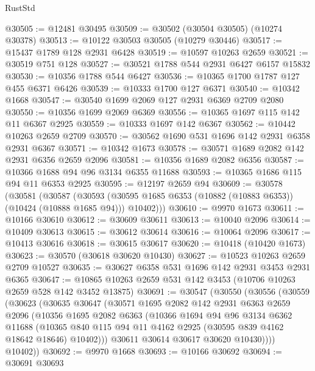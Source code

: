 \begin{lexlean}{RustStd}
\begin{coremodule}
@30505 := @12481 @30495
@30509 := @30502 (@30504 @30505) (@10274 @30378)
@30513 := @10122 @30503 @30505 (@10279 @30446)
@30517 := @15437 @1789 @128 @2931 @6428
@30519 := @10597 @10263 @2659
@30521 := @30519 @751 @128
@30527 := @30521 @1788 @544 @2931 @6427 @6157 @15832
@30530 := @10356 @1788 @544 @6427
@30536 := @10365 @1700 @1787 @127 @455 @6371 @6426
@30539 := @10333 @1700 @127 @6371
@30540 := @10342 @1668
@30547 := @30540 @1699 @2069 @127 @2931 @6369 @2709 @2080
@30550 := @10356 @1699 @2069 @6369
@30556 := @10365 @1697 @115 @142 @11 @6367 @2925
@30559 := @10333 @1697 @142 @6367
@30562 := @10442 @10263 @2659 @2709
@30570 := @30562 @1690 @531 @1696 @142 @2931 @6358 @2931 @6367
@30571 := @10342 @1673
@30578 := @30571 @1689 @2082 @142 @2931 @6356 @2659 @2096
@30581 := @10356 @1689 @2082 @6356
@30587 := @10366 @1688 @94 @96 @3134 @6355 @11688
@30593 := @10365 @1686 @115 @94 @11 @6353 @2925
@30595 := @12197 @2659 @94
@30609 := @30578
    (@30581
      (@30587
        (@30593 (@30595 @1685 @6353 (@10882 (@10883 @6353)) (@10424 (@10888 @1685 @94))) @10402)))
@30610 := @9970 @1673
@30611 := @10166 @30610
@30612 := @30609 @30611
@30613 := @10040 @2096
@30614 := @10409 @30613
@30615 := @30612 @30614
@30616 := @10064 @2096
@30617 := @10413 @30616
@30618 := @30615 @30617
@30620 := @10418 (@10420 @1673)
@30623 := @30570 (@30618 @30620 @10430)
@30627 := @10523 @10263 @2659 @2709 @10527
@30635 := @30627 @6358 @531 @1696 @142 @2931 @3453 @2931 @6365
@30647 := @10865 @10263 @2659 @531 @142 @3453 (@10706 @10263 @2659 @528 @142 @3452 @13875)
@30691 := @30547
    (@30550
      (@30556
        (@30559
          (@30623
            (@30635
              @30647
              (@30571
                @1695
                @2082
                @142
                @2931
                @6363
                @2659
                @2096
                (@10356
                  @1695
                  @2082
                  @6363
                  (@10366
                    @1694
                    @94
                    @96
                    @3134
                    @6362
                    @11688
                    (@10365
                      @840
                      @115
                      @94
                      @11
                      @4162
                      @2925
                      (@30595 @839 @4162 @18642 @18646)
                      @10402)))
                @30611
                @30614
                @30617
                @30620
                @10430))))
        @10402))
@30692 := @9970 @1668
@30693 := @10166 @30692
@30694 := @30691 @30693

\end{coremodule}
\end{lexlean}
